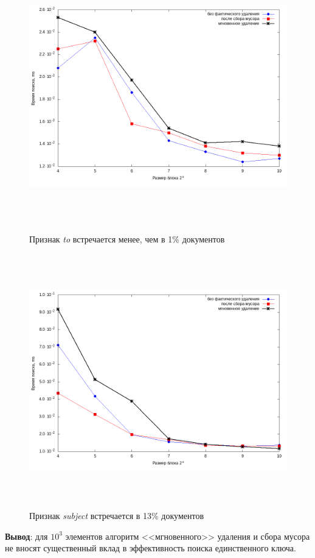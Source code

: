 \begin{figure}[H]
\includegraphics[width=\linewidth, height=11cm]{fig/limit_1/1e3/to.png}
\caption{Признак \textit{to} встречается менее, чем в 1\% документов}
\includegraphics[width=\linewidth, height=11cm]{fig/limit_1/1e3/subject.png}
\caption{Признак \textit{subject} встречается в 13\% документов}
\end{figure}

\textbf{Вывод}: для $10^3$ элементов алгоритм <<мгновенного>> удаления и сбора мусора
не вносят существенный вклад в эффективность поиска единственного ключа.

